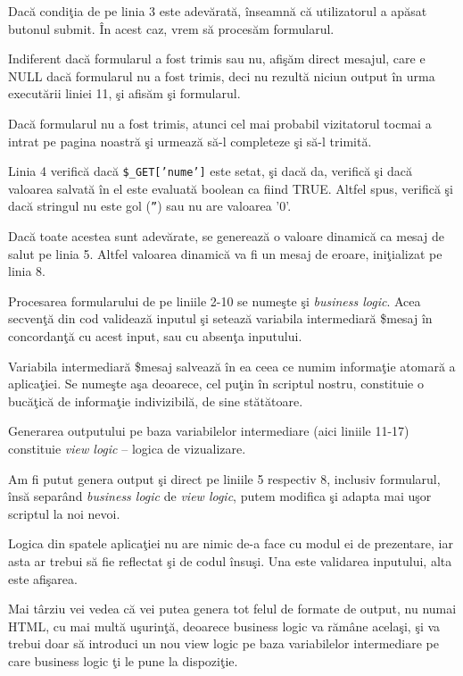 Dacă condiţia de pe linia 3 este adevărată, înseamnă că utilizatorul a apăsat
butonul {\glqq}submit{\grqq}. În acest caz, vrem să procesăm formularul.

Indiferent
dacă formularul a fost trimis sau nu, 
afişăm direct mesajul, care e NULL dacă formularul nu a fost trimis, deci nu rezultă niciun output în
urma executării liniei 11, şi afisăm şi formularul.

Dacă formularul nu a fost trimis, atunci cel mai probabil vizitatorul tocmai a intrat
pe pagina noastră şi urmează să-l completeze şi să-l trimită.

Linia 4 verifică dacă \texttt{\$\_GET['nume']} este setat, şi dacă da, verifică
şi dacă valoarea salvată în el este evaluată boolean ca fiind TRUE. Altfel spus,
verifică şi dacă stringul nu este gol (\texttt{''}) sau nu are valoarea '0'.

Dacă toate acestea sunt adevărate, se generează o valoare dinamică ca mesaj de salut pe linia 5.
Altfel valoarea dinamică va fi un mesaj de eroare, iniţializat pe linia 8.

Procesarea formularului de pe liniile 2-10 se numeşte şi \textsl{business logic}.
Acea secvenţă
din cod validează inputul şi setează variabila intermediară \$mesaj în concordanţă
cu acest input, sau cu absenţa inputului.

Variabila intermediară \$mesaj salvează în ea ceea ce numim {\glqq}informaţie atomară a aplicaţiei{\grqq}.
Se numeşte aşa deoarece, cel puţin în scriptul nostru, constituie o bucăţică de informaţie
indivizibilă, de sine stătătoare.

Generarea outputului pe baza variabilelor intermediare (aici liniile 11-17) constituie
\textsl{view logic} -- logica de vizualizare.

Am fi putut genera output şi direct pe liniile 5 respectiv 8, inclusiv formularul,
însă separând \textsl{business logic} de \textsl{view logic},
putem modifica şi adapta mai uşor scriptul la noi nevoi.

Logica din spatele aplicaţiei nu are nimic de-a face cu modul ei de prezentare, iar
asta ar trebui să fie reflectat şi de codul însuşi. Una este validarea inputului,
alta este afişarea.

Mai târziu vei vedea că vei putea genera tot felul de formate de output, nu numai HTML,
cu mai multă uşurinţă, deoarece business logic va rămâne acelaşi, şi va trebui
doar să introduci un nou view logic pe baza variabilelor intermediare pe care business logic
ţi le pune la dispoziţie.

